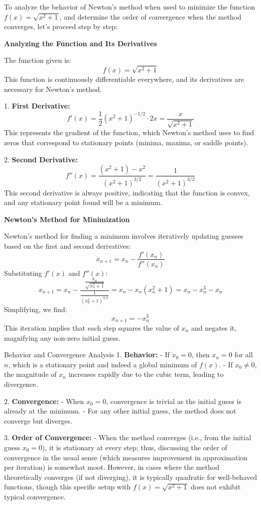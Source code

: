 \documentclass[8pt]{article}
\begin{document}
To analyze the behavior of Newton’s method when used to minimize the function \(f(x) = \sqrt{x^2 + 1}\), and determine the order of convergence when the method converges, let's proceed step by step:

\textbf{Analyzing the Function and Its Derivatives}

The function given is:
\[
f(x) = \sqrt{x^2 + 1}
\]
This function is continuously differentiable everywhere, and its derivatives are necessary for Newton's method.

1. \textbf{First Derivative:}
   \[
   f'(x) = \frac{1}{2}(x^2 + 1)^{-1/2} \cdot 2x = \frac{x}{\sqrt{x^2 + 1}}
   \]
   This represents the gradient of the function, which Newton's method uses to find zeros that correspond to stationary points (minima, maxima, or saddle points).

2. \textbf{Second Derivative:}
   \[
   f''(x) = \frac{(x^2 + 1) - x^2}{(x^2 + 1)^{3/2}} = \frac{1}{(x^2 + 1)^{3/2}}
   \]
   This second derivative is always positive, indicating that the function is convex, and any stationary point found will be a minimum.

\textbf{Newton's Method for Minimization}

Newton’s method for finding a minimum involves iteratively updating guesses based on the first and second derivatives:
\[
x_{n+1} = x_n - \frac{f'(x_n)}{f''(x_n)}
\]
Substituting \(f'(x)\) and \(f''(x)\):
\[
x_{n+1} = x_n - \frac{\frac{x_n}{\sqrt{x_n^2 + 1}}}{\frac{1}{(x_n^2 + 1)^{3/2}}} = x_n - x_n(x_n^2 + 1) = x_n - x_n^3 - x_n
\]
Simplifying, we find:
\[
x_{n+1} = -x_n^3
\]
This iteration implies that each step squares the value of \(x_n\) and negates it, magnifying any non-zero initial guess.

Behavior and Convergence Analysis\textbf{
}
1. \textbf{Behavior:}
   - If \(x_0 = 0\), then \(x_n = 0\) for all \(n\), which is a stationary point and indeed a global minimum of \(f(x)\).
   - If \(x_0 \neq 0\), the magnitude of \(x_n\) increases rapidly due to the cubic term, leading to divergence.

2. \textbf{Convergence:}
   - When \(x_0 = 0\), convergence is trivial as the initial guess is already at the minimum.
   - For any other initial guess, the method does not converge but diverges.

3. \textbf{Order of Convergence:}
   - When the method converges (i.e., from the initial guess \(x_0 = 0\)), it is stationary at every step; thus, discussing the order of convergence in the usual sense (which measures improvement in approximation per iteration) is somewhat moot. However, in cases where the method theoretically converges (if not diverging), it is typically quadratic for well-behaved functions, though this specific setup with \(f(x) = \sqrt{x^2 + 1}\) does not exhibit typical convergence.
\end{document}
